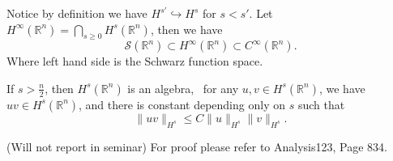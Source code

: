 \documentclass[UTF8,12pt]{article}
\numberwithin{theorem}{section}
\numberwithin{equation}{section}
\begin{document}
\begin{prop}\hfill\par
    Notice by definition we have \(H^{s'}\hookrightarrow H^{s}\) for \(s<s'\).
    Let \(H^\infty(\mathbb{R}^n)=\bigcap_{s\ge 0}H^s(\mathbb{R}^n)\), then we have \[
        \mathcal{S}(\mathbb{R}^n)\subset H^{\infty}(\mathbb{R}^n)\subset 
        C^\infty(\mathbb{R}^n)
    .\] Where left hand side is the Schwarz function space.
\end{prop}

\begin{theorem}
    If \(s>\frac{n}{2}\), then \(H^s(\mathbb{R}^n)\) is an algebra, \ie\ for any
    \(u,v\in H^s(\mathbb{R}^n)\), we have \(uv\in H^s(\mathbb{R}^n)\), and
    there is constant depending only on \(s\) such that \[
        \|uv\|_{H^s}\le C\|u\|_{H^s}\|v\|_{H^s}
    .\] 
\end{theorem}
\begin{remark}
    (Will not report in seminar) For proof please refer to Analysis123, Page 834.
\end{remark}
\end{document}
